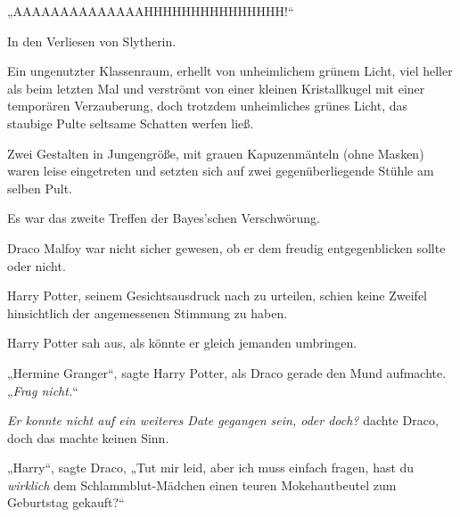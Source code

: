 „AAAAAAAAAAAAAAHHHHHHHHHHHHHHH!“

\later

In den Verliesen von Slytherin.

Ein ungenutzter Klassenraum, erhellt von unheimlichem grünem Licht, viel heller als beim letzten Mal und verströmt von einer kleinen Kristallkugel mit einer temporären Verzauberung, doch trotzdem unheimliches grünes Licht, das staubige Pulte seltsame Schatten werfen ließ.

Zwei Gestalten in Jungengröße, mit grauen Kapuzenmänteln (ohne Masken) waren leise eingetreten und setzten sich auf zwei gegenüberliegende Stühle am selben Pult.

Es war das zweite Treffen der Bayes’schen Verschwörung.

Draco Malfoy war nicht sicher gewesen, ob er dem freudig entgegenblicken sollte oder nicht.

Harry Potter, seinem Gesichtsausdruck nach zu urteilen, schien keine Zweifel hinsichtlich der angemessenen Stimmung zu haben.

Harry Potter sah aus, als könnte er gleich jemanden umbringen.

„Hermine Granger“, sagte Harry Potter, als Draco gerade den Mund aufmachte.
„\emph{Frag nicht.}“

\emph{Er konnte nicht auf ein weiteres Date gegangen sein, oder doch?} dachte Draco, doch das machte keinen Sinn.

„Harry“, sagte Draco,
„Tut mir leid, aber ich muss einfach fragen, hast du \emph{wirklich} dem Schlammblut-Mädchen einen teuren Mokehautbeutel zum Geburtstag gekauft?“

